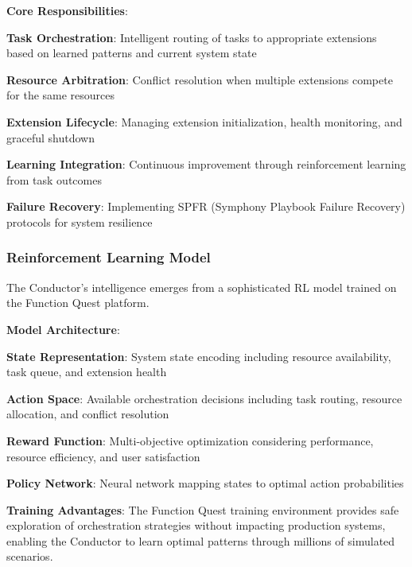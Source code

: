 \textbf{Core Responsibilities}:
\begin{expandedlist}
    \item \textbf{Task Orchestration}: Intelligent routing of tasks to appropriate extensions based on learned patterns and current system state
    \item \textbf{Resource Arbitration}: Conflict resolution when multiple extensions compete for the same resources
    \item \textbf{Extension Lifecycle}: Managing extension initialization, health monitoring, and graceful shutdown
    \item \textbf{Learning Integration}: Continuous improvement through reinforcement learning from task outcomes
    \item \textbf{Failure Recovery}: Implementing SPFR (Symphony Playbook Failure Recovery) protocols for system resilience
\end{expandedlist}

\subsubsection*{Reinforcement Learning Model}

The Conductor's intelligence emerges from a sophisticated RL model trained on the Function Quest platform.

\textbf{Model Architecture}:
\begin{compactlist}
    \item \textbf{State Representation}: System state encoding including resource availability, task queue, and extension health
    \item \textbf{Action Space}: Available orchestration decisions including task routing, resource allocation, and conflict resolution
    \item \textbf{Reward Function}: Multi-objective optimization considering performance, resource efficiency, and user satisfaction
    \item \textbf{Policy Network}: Neural network mapping states to optimal action probabilities
\end{compactlist}

\begin{successbox}
\textbf{Training Advantages}: The Function Quest training environment provides safe exploration of orchestration strategies without impacting production systems, enabling the Conductor to learn optimal patterns through millions of simulated scenarios.
\end{successbox}


